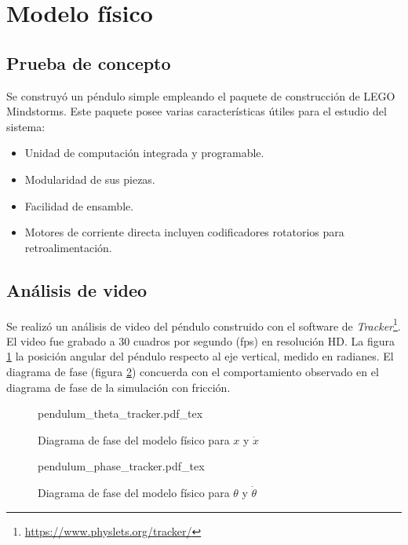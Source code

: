 \pagebreak

\section{Modelo físico}
\subsection{Prueba de concepto}

Se construyó un péndulo simple empleando 
el paquete de construcción de LEGO Mindstorms.
Este paquete posee varias características
útiles para el estudio del sistema:
\begin{itemize}
 \item Unidad de computación integrada y programable.
 \item Modularidad de sus piezas.
 \item Facilidad de ensamble.
 \item Motores de corriente directa incluyen 
 codificadores rotatorios para retroalimentación.
\end{itemize}

\subsection{Análisis de video}

Se realizó un análisis de video del péndulo construido con 
el software de \emph{Tracker}\footnote{\url{https://www.physlets.org/tracker/}}.
El video fue grabado a 30 cuadros por segundo (fps) en resolución HD.
La figura \ref{fig: tracker theta} la posición angular del 
péndulo respecto al eje vertical, medido en radianes.
El diagrama de fase (figura \ref{fig: tracker phase diagram theta dtheta})
concuerda con el comportamiento observado en el diagrama de fase de 
la simulación con fricción.


\begin{figure}[htb!]
 \centering
{pendulum_theta_tracker.pdf_tex}
 \caption{Diagrama de fase del modelo físico para $x$ y $\dot{x}$}
 \label{fig: tracker theta}
\end{figure}

\begin{figure}[htb!]
 \centering
{pendulum_phase_tracker.pdf_tex}
 \caption{Diagrama de fase del modelo físico para $\theta$ y $\dot \theta$}
 \label{fig: tracker phase diagram theta dtheta}
\end{figure}


